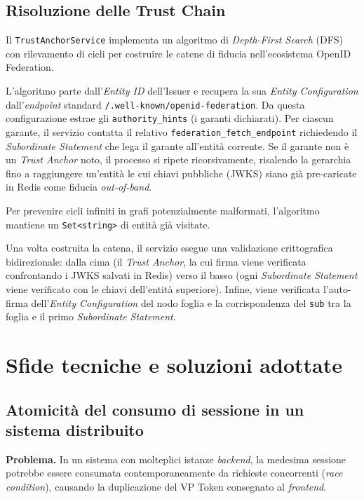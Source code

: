 \subsection{Risoluzione delle Trust Chain}
Il \texttt{TrustAnchorService} implementa un algoritmo di \textit{Depth-First Search} (DFS\glsfirstoccur{}) con rilevamento di cicli per costruire le catene di fiducia nell'ecosistema OpenID Federation.

L'algoritmo parte dall'\textit{Entity ID} dell'Issuer e recupera la sua \textit{Entity Configuration} dall'\textit{endpoint} standard \texttt{/.well-\allowbreak{}known/openid-\allowbreak{}federation}. Da questa configurazione estrae gli \texttt{authority\_\allowbreak{}hints} (i garanti dichiarati). Per ciascun garante, il servizio contatta il relativo \texttt{federation\_\allowbreak{}fetch\_\allowbreak{}endpoint} richiedendo il \textit{Subordinate Statement} che lega il garante all'entità corrente. Se il garante non è un \textit{Trust Anchor} noto, il processo si ripete ricorsivamente, risalendo la gerarchia fino a raggiungere un'entità le cui chiavi pubbliche (JWKS) siano già pre-caricate in Redis come fiducia \textit{out-of-band}.

Per prevenire cicli infiniti in grafi potenzialmente malformati, l'algoritmo mantiene un \texttt{Set<string>} di entità già visitate.

Una volta costruita la catena, il servizio esegue una validazione crittografica bidirezionale: dalla cima (il \textit{Trust Anchor}, la cui firma viene verificata confrontando i JWKS salvati in Redis) verso il basso (ogni \textit{Subordinate Statement} viene verificato con le chiavi dell'entità superiore). Infine, viene verificata l'auto-firma dell'\textit{Entity Configuration} del nodo foglia e la corrispondenza del \texttt{sub} tra la foglia e il primo \textit{Subordinate Statement}.

\section{Sfide tecniche e soluzioni adottate}

\subsection{Atomicità del consumo di sessione in un sistema distribuito}
\textbf{Problema.} In un sistema con molteplici istanze \textit{backend}, la medesima sessione potrebbe essere consumata contemporaneamente da richieste concorrenti (\textit{race condition}), causando la duplicazione del VP Token consegnato al \textit{frontend}.


